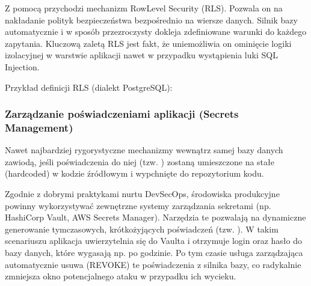 \documentclass[a4paper,11pt,english,openany,oneside]{sphinxmanual}
\begin{document}
\sphinxAtStartPar
Z pomocą przychodzi mechanizm Row\sphinxhyphen{}Level Security (RLS). Pozwala on na nakładanie polityk bezpieczeństwa bezpośrednio na wiersze danych. Silnik bazy automatycznie i w sposób przezroczysty dokleja zdefiniowane warunki do każdego zapytania. Kluczową zaletą RLS jest fakt, że uniemożliwia on ominięcie logiki izolacyjnej w warstwie aplikacji \textendash{} nawet w przypadku wystąpienia luki SQL Injection.

\sphinxAtStartPar
Przykład definicji RLS (dialekt PostgreSQL):

\begin{sphinxVerbatim}[commandchars=\\\{\}]

\end{sphinxVerbatim}


\subsubsection{Zarządzanie poświadczeniami aplikacji (Secrets Management)}
\label{\detokenize{rozdzial_2/rozdzial_27/rozdzial_3:zarzadzanie-poswiadczeniami-aplikacji-secrets-management}}
\sphinxAtStartPar
Nawet najbardziej rygorystyczne mechanizmy wewnątrz samej bazy danych zawiodą, jeśli poświadczenia do niej (tzw. ) zostaną umieszczone na stałe (hardcoded) w kodzie źródłowym i wypchnięte do repozytorium kodu.

\sphinxAtStartPar
Zgodnie z dobrymi praktykami nurtu DevSecOps, środowiska produkcyjne powinny wykorzystywać zewnętrzne systemy zarządzania sekretami (np. HashiCorp Vault, AWS Secrets Manager). Narzędzia te pozwalają na dynamiczne generowanie tymczasowych, krótkożyjących poświadczeń (tzw. ). W takim scenariuszu aplikacja uwierzytelnia się do Vaulta i otrzymuje login oraz hasło do bazy danych, które wygasają np. po godzinie. Po tym czasie usługa zarządzająca automatycznie usuwa (REVOKE) te poświadczenia z silnika bazy, co radykalnie zmniejsza okno potencjalnego ataku w przypadku ich wycieku.
\end{document}
